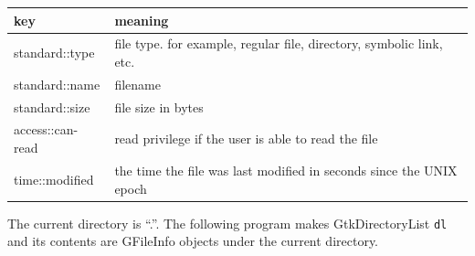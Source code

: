 \begin{longtable}[]{@{}ll@{}}
\toprule
\begin{minipage}[b]{0.18\columnwidth}\raggedright
key\strut
\end{minipage} & \begin{minipage}[b]{0.76\columnwidth}\raggedright
meaning\strut
\end{minipage}\tabularnewline
\midrule
\endhead
\begin{minipage}[t]{0.18\columnwidth}\raggedright
standard::type\strut
\end{minipage} & \begin{minipage}[t]{0.76\columnwidth}\raggedright
file type. for example, regular file, directory, symbolic link,
etc.\strut
\end{minipage}\tabularnewline
\begin{minipage}[t]{0.18\columnwidth}\raggedright
standard::name\strut
\end{minipage} & \begin{minipage}[t]{0.76\columnwidth}\raggedright
filename\strut
\end{minipage}\tabularnewline
\begin{minipage}[t]{0.18\columnwidth}\raggedright
standard::size\strut
\end{minipage} & \begin{minipage}[t]{0.76\columnwidth}\raggedright
file size in bytes\strut
\end{minipage}\tabularnewline
\begin{minipage}[t]{0.18\columnwidth}\raggedright
access::can-read\strut
\end{minipage} & \begin{minipage}[t]{0.76\columnwidth}\raggedright
read privilege if the user is able to read the file\strut
\end{minipage}\tabularnewline
\begin{minipage}[t]{0.18\columnwidth}\raggedright
time::modified\strut
\end{minipage} & \begin{minipage}[t]{0.76\columnwidth}\raggedright
the time the file was last modified in seconds since the UNIX
epoch\strut
\end{minipage}\tabularnewline
\bottomrule
\end{longtable}

The current directory is ``.''. The following program makes
GtkDirectoryList \passthrough{\lstinline!dl!} and its contents are
GFileInfo objects under the current directory.

